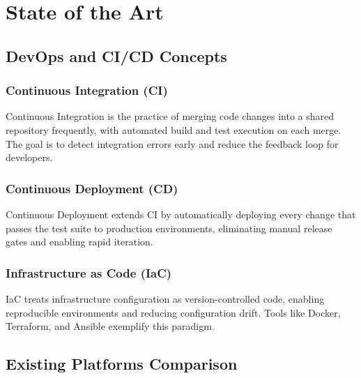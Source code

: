 \documentclass[12pt,a4paper,twoside]{report}
\begin{document}
\chapter{State of the Art}

\section{DevOps and CI/CD Concepts}

\subsection{Continuous Integration (CI)}
Continuous Integration is the practice of merging code changes into a shared repository frequently, with automated build and test execution on each merge. The goal is to detect integration errors early and reduce the feedback loop for developers.

\subsection{Continuous Deployment (CD)}
Continuous Deployment extends CI by automatically deploying every change that passes the test suite to production environments, eliminating manual release gates and enabling rapid iteration.

\subsection{Infrastructure as Code (IaC)}
IaC treats infrastructure configuration as version-controlled code, enabling reproducible environments and reducing configuration drift. Tools like Docker, Terraform, and Ansible exemplify this paradigm.

\section{Existing Platforms Comparison}
\end{document}
